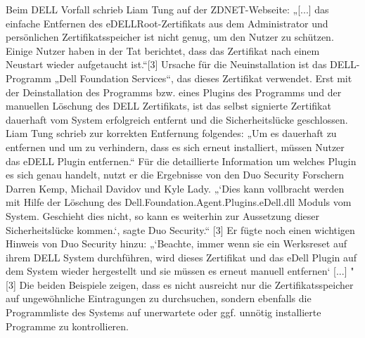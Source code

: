 Beim DELL Vorfall schrieb Liam Tung auf der ZDNET-Webseite: „[...] das einfache Entfernen des eDELLRoot-Zertifikats aus dem Administrator und persönlichen Zertifikatsspeicher ist nicht genug, um den Nutzer zu schützen. Einige Nutzer haben in der Tat berichtet, dass das Zertifikat nach einem Neustart wieder aufgetaucht ist.“[3]  Ursache für die Neuinstallation ist das DELL-Programm „Dell Foundation Services“, das dieses Zertifikat verwendet. Erst mit der Deinstallation des Programms bzw. eines Plugins des Programms und der manuellen Löschung des DELL Zertifikats, ist das selbst signierte Zertifikat dauerhaft vom System erfolgreich entfernt und die Sicherheitslücke geschlossen. Liam Tung schrieb zur korrekten Entfernung folgendes: „Um es dauerhaft zu entfernen und um zu verhindern, dass es sich erneut installiert, müssen Nutzer das eDELL Plugin entfernen.“ Für die detaillierte Information um welches Plugin es sich genau handelt, nutzt er die Ergebnisse von den Duo Security Forschern Darren Kemp, Michail Davidov und Kyle Lady. „‘Dies kann vollbracht werden mit Hilfe der Löschung des Dell.Foundation.Agent.Plugins.eDell.dll Moduls vom System. Geschieht dies nicht, so kann es weiterhin zur Aussetzung dieser Sicherheitslücke kommen.‘, sagte Duo Security.“ [3] Er fügte noch einen wichtigen Hinweis von Duo Security hinzu: „‘Beachte, immer wenn sie ein Werksreset auf ihrem DELL System durchführen, wird dieses Zertifikat und das eDell Plugin auf dem System wieder hergestellt und sie müssen es erneut manuell entfernen‘ [...] " [3]
Die beiden Beispiele zeigen, dass es nicht ausreicht nur die Zertifikatsspeicher auf ungewöhnliche Eintragungen zu durchsuchen, sondern ebenfalls die Programmliste des Systems auf unerwartete oder ggf. unnötig installierte Programme zu kontrollieren.